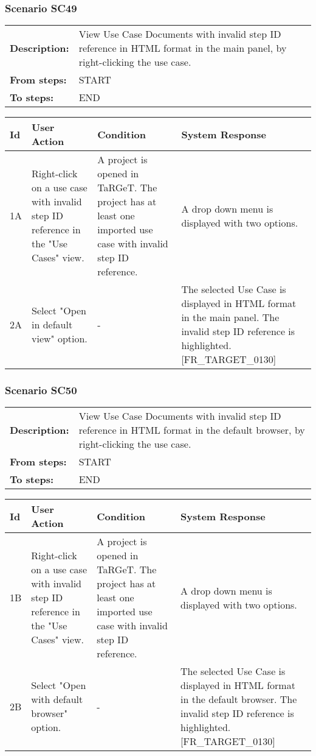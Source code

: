 \documentclass[a4paper,11pt]{article}
\newcommand{\bl}{\\ \hline}
\begin{document}
\subsubsection*{Scenario SC49}
\begin{tabular}{p{1in}p{4in}}
{\bf Description:} & View Use Case Documents with invalid step ID reference
					in HTML format in the main panel, by right-clicking the use case.
				 \\
{\bf From steps:} & START \\
{\bf To steps:} & END \\
\end{tabular}
 
\begin{tabular}{|p{0.8in}|p{1.6in}|p{1.6in}|p{1.6in}|}
\hline
Id & User Action & Condition & System Response  \bl 
1A & Right-click on a use case with invalid step ID reference in
						the "Use Cases" view. & A project is opened in TaRGeT. The project has at least
						one imported use case with invalid step ID reference. & A drop down menu is displayed with two options.
					 \bl 
2A & Select "Open in default view" option. & - & The selected Use Case is displayed in HTML format in the
						main panel. The invalid step ID reference is highlighted.
						[FR_TARGET_0130]  \bl 
\end{tabular}
\subsubsection*{Scenario SC50}
\begin{tabular}{p{1in}p{4in}}
{\bf Description:} & View Use Case Documents with invalid step ID reference
					in HTML format in the default browser, by right-clicking the use
					case. \\
{\bf From steps:} & START \\
{\bf To steps:} & END \\
\end{tabular}
 
\begin{tabular}{|p{0.8in}|p{1.6in}|p{1.6in}|p{1.6in}|}
\hline
Id & User Action & Condition & System Response  \bl 
1B & Right-click on a use case with invalid step ID reference in
						the "Use Cases" view. & A project is opened in TaRGeT. The project has at least
						one imported use case with invalid step ID reference. & A drop down menu is displayed with two options.
					 \bl 
2B & Select "Open with default browser" option. & - & The selected Use Case is displayed in HTML format in the
						default browser. The invalid step ID reference is highlighted.
						[FR_TARGET_0130] \bl 
\end{tabular}
\end{document}
